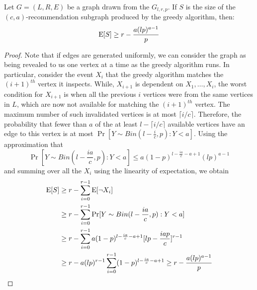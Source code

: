 \begin{thm}
Let $G=(L,R,E)$ be a graph drawn from the $G_{l,r,p}$. If $S$ is the size of the $(c,a)$-recommendation subgraph produced by the greedy algorithm, then:
\[ \text{E}[S] \geq r - \frac{a(lp)^{a-1}}{p}\]
\end{thm}
\begin{proof}
Note that if edges are generated uniformly, we can consider the
graph as being revealed to us one vertex at a time as the greedy
algorithm runs. In particular, consider the event $X_i$ that the
greedy algorithm matches the $(i+1)^{th}$ vertex it inspects. While,
$X_{i+1}$ is dependent on $X_1,\ldots, X_i$, the worst condition for
$X_{i+1}$ is when all the previous $i$ vertices were from the same
vertices in $L$, which are now not available for matching the
$(i+1)^{th}$ vertex. The maximum number of such invalidated vertices
is at most $\lceil i/c \rceil$. Therefore, the probability that fewer
than $a$ of the at least $l-\lceil i/c \rceil $ available 
vertices have an edge to this vertex is at most $\Pr[Y\sim Bin(l-\frac{i}{c},p): Y < a]$.
Using the approximation that
\[ \Pr[Y\sim Bin(l-\frac{ia}{c},p): Y < a] \leq a(1-p)^{l-\frac{ia}{c}-a+1}(lp)^{a-1}\]
and summing over all the $X_i$ using the linearity of expectation,
we obtain
\begin{align*}
      \text{E}[S]
&\geq r - \sum_{i=0}^{r-1} \text{E}[\lnot X_i] \\
&\geq r - \sum_{i=0}^{r-1} \Pr[Y \sim Bin(l-\frac{ia}{c},p): Y < a] \\
&\geq r - \sum_{i=0}^{r-1}a(1-p)^{l-\frac{ia}{c}-a+1}[lp-\frac{iap}{c}]^{r-1} \\
&\geq r - a(lp)^{r-1}\sum_{i=0}^{r-1}(1-p)^{l-\frac{ia}{c}-a+1} \geq r - \frac{a(lp)^{a-1}}{p}\\
\end{align*}
\end{proof} 
